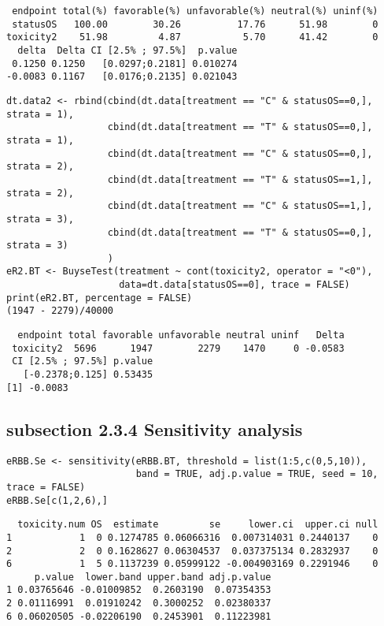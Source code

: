 \documentclass[12pt]{article}
\begin{document}
\begin{verbatim}
 endpoint total(%) favorable(%) unfavorable(%) neutral(%) uninf(%)
 statusOS   100.00        30.26          17.76      51.98        0
toxicity2    51.98         4.87           5.70      41.42        0
  delta  Delta CI [2.5% ; 97.5%]  p.value
 0.1250 0.1250   [0.0297;0.2181] 0.010274
-0.0083 0.1167   [0.0176;0.2135] 0.021043
\end{verbatim}


\lstset{language=r,label= ,caption= ,captionpos=b,numbers=none}
\begin{lstlisting}
dt.data2 <- rbind(cbind(dt.data[treatment == "C" & statusOS==0,], strata = 1),
                  cbind(dt.data[treatment == "T" & statusOS==0,], strata = 1),
                  cbind(dt.data[treatment == "C" & statusOS==0,], strata = 2),
                  cbind(dt.data[treatment == "T" & statusOS==1,], strata = 2),
                  cbind(dt.data[treatment == "C" & statusOS==1,], strata = 3),
                  cbind(dt.data[treatment == "T" & statusOS==0,], strata = 3)
                  )
eR2.BT <- BuyseTest(treatment ~ cont(toxicity2, operator = "<0"),
                    data=dt.data[statusOS==0], trace = FALSE)
print(eR2.BT, percentage = FALSE)
(1947 - 2279)/40000
\end{lstlisting}

\begin{verbatim}
  endpoint total favorable unfavorable neutral uninf   Delta
 toxicity2  5696      1947        2279    1470     0 -0.0583
 CI [2.5% ; 97.5%] p.value
   [-0.2378;0.125] 0.53435
[1] -0.0083
\end{verbatim}

\subsection{subsection 2.3.4 Sensitivity analysis}
\label{sec:orgbb59c2a}

\lstset{language=r,label= ,caption= ,captionpos=b,numbers=none}
\begin{lstlisting}
eRBB.Se <- sensitivity(eRBB.BT, threshold = list(1:5,c(0,5,10)),
                       band = TRUE, adj.p.value = TRUE, seed = 10, trace = FALSE)
eRBB.Se[c(1,2,6),]
\end{lstlisting}

\begin{verbatim}
  toxicity.num OS  estimate         se     lower.ci  upper.ci null
1            1  0 0.1274785 0.06066316  0.007314031 0.2440137    0
2            2  0 0.1628627 0.06304537  0.037375134 0.2832937    0
6            1  5 0.1137239 0.05999122 -0.004903169 0.2291946    0
     p.value  lower.band upper.band adj.p.value
1 0.03765646 -0.01009852  0.2603190  0.07354353
2 0.01116991  0.01910242  0.3000252  0.02380337
6 0.06020505 -0.02206190  0.2453901  0.11223981
\end{verbatim}
\end{document}

